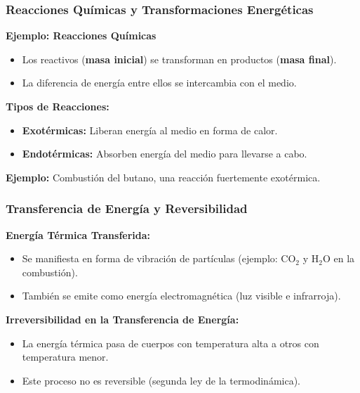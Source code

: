 \documentclass[main.tex]{subfiles}
\begin{document}
\begin{frame}
    \frametitle{Reacciones Químicas y Transformaciones Energéticas}

    \textbf{Ejemplo: Reacciones Químicas}
    \begin{itemize}
        \item Los reactivos (\textbf{masa inicial}) se transforman en productos (\textbf{masa final}).
        \item La diferencia de energía entre ellos se intercambia con el medio.
    \end{itemize}

    \vspace{0.3cm}
    \textbf{Tipos de Reacciones:}
    \begin{itemize}
        \item \textbf{Exotérmicas:} Liberan energía al medio en forma de calor.
        \item \textbf{Endotérmicas:} Absorben energía del medio para llevarse a cabo.
    \end{itemize}

    \centering

    \vspace{0.3cm}
    \textbf{Ejemplo:} Combustión del butano, una reacción fuertemente exotérmica.
\end{frame}

\begin{frame}
    \frametitle{Transferencia de Energía y Reversibilidad}

    \textbf{Energía Térmica Transferida:}
    \begin{itemize}
        \item Se manifiesta en forma de vibración de partículas (ejemplo: CO$_2$ y H$_2$O en la combustión).
        \item También se emite como energía electromagnética (luz visible e infrarroja).
    \end{itemize}

    \vspace{0.3cm}
    \textbf{Irreversibilidad en la Transferencia de Energía:}
    \begin{itemize}
        \item La energía térmica pasa de cuerpos con temperatura alta a otros con temperatura menor.
        \item Este proceso no es reversible (segunda ley de la termodinámica).
    \end{itemize}

\end{frame}
\end{document}
